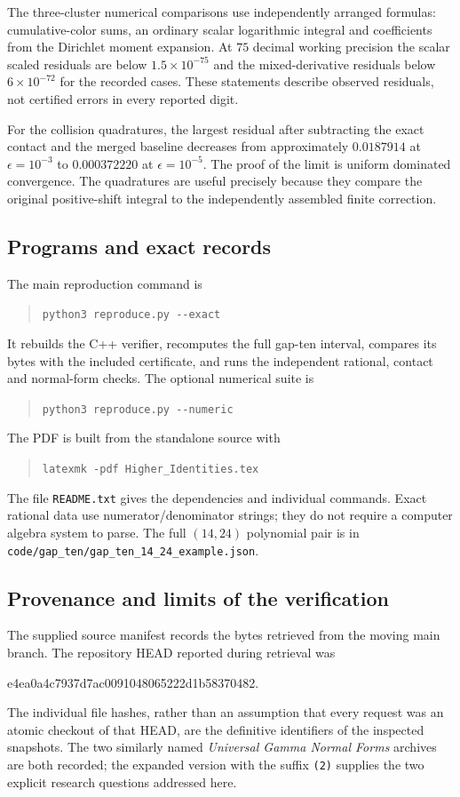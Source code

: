 \documentclass[11pt,a4paper]{article}
\theoremstyle{definition}
\theoremstyle{remark}
\numberwithin{equation}{section}
\newcommand{\file}[1]{\nolinkurl{#1}}
\begin{document}
The three-cluster numerical comparisons use independently arranged
formulas: cumulative-color sums, an ordinary scalar logarithmic
integral and coefficients from the Dirichlet moment expansion.
At $75$ decimal working precision the scalar scaled residuals are
below $1.5\times10^{-75}$ and the mixed-derivative residuals below
$6\times10^{-72}$ for the recorded cases. These statements describe
observed residuals, not certified errors in every reported digit.

For the collision quadratures, the largest residual after subtracting
the exact contact and the merged baseline decreases from approximately
$0.0187914$ at $\epsilon=10^{-3}$ to $0.000372220$ at
$\epsilon=10^{-5}$. The proof of the limit is uniform dominated
convergence. The quadratures are useful precisely because they compare
the original positive-shift integral to the independently assembled
finite correction.

\subsection{Programs and exact records}

The main reproduction command is
\begin{quote}
\verb|python3 reproduce.py --exact|
\end{quote}
It rebuilds the C++ verifier, recomputes the full gap-ten interval,
compares its bytes with the included certificate, and runs the
independent rational, contact and normal-form checks.
The optional numerical suite is
\begin{quote}
\verb|python3 reproduce.py --numeric|
\end{quote}
The PDF is built from the standalone source with
\begin{quote}
\verb|latexmk -pdf Higher_Identities.tex|
\end{quote}
The file \file{README.txt} gives the dependencies and individual
commands. Exact rational data use numerator/denominator strings;
they do not require a computer algebra system to parse.
The full $(14,24)$ polynomial pair is in
\file{code/gap_ten/gap_ten_14_24_example.json}.

\subsection{Provenance and limits of the verification}

The supplied source manifest records the bytes retrieved from the
moving main branch. The repository HEAD reported during retrieval was
\begin{center}\small\ttfamily
e4ea0a4c7937d7ac0091048065222d1b58370482.
\end{center}
The individual file hashes, rather than an assumption that every
request was an atomic checkout of that HEAD, are the definitive
identifiers of the inspected snapshots. The two similarly named
\emph{Universal Gamma Normal Forms} archives are both recorded;
the expanded version with the suffix \texttt{(2)} supplies the
two explicit research questions addressed here.
\end{document}
